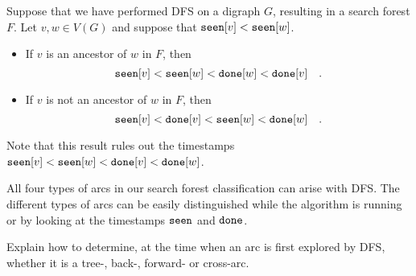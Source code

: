 %


\begin{Theorem}
\label{thm:DFS-seen-done}
Suppose that we have performed DFS on a digraph $G$, resulting in a 
search forest $F$. Let $v, w \in V(G)$ and suppose that $\seen[v] < \seen[w]$. 

\begin{itemize}
\item
If $v$ is an ancestor of $w$ in $F$, then 
$$\seen[v] < \seen[w] < \done[w] < \done[v] \quad .$$
\item
If $v$ is not an ancestor of $w$ in $F$, then
$$\seen[v] < \done[v]  < \seen[w] < \done[w] \quad .$$
\end{itemize}
\end{Theorem}

Note that this result rules out  the timestamps $\seen[v] < \seen[w] < \done[v] < \done[w]$.



All four types of arcs in our search forest classification can
arise with DFS. The different types of arcs can be easily
distinguished while the algorithm is running or by looking at the timestamps 
$\seen$ and $\done$.

\begin{Boxample}[3]
Explain how to determine, at the time when an arc is first explored by
DFS, whether it is a tree-, back-, forward- or cross-arc.
\end{Boxample}

